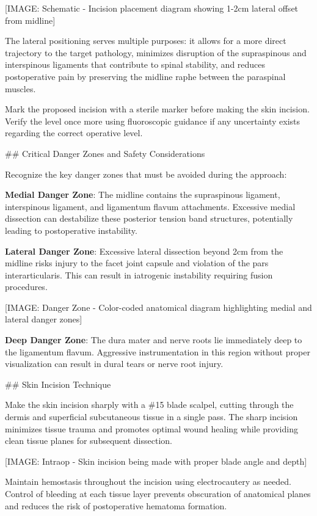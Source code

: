 \documentclass[12pt,a4paper]{article}
\begin{document}
[IMAGE: Schematic - Incision placement diagram showing 1-2cm lateral offset from midline]

The lateral positioning serves multiple purposes: it allows for a more direct trajectory to the target pathology, minimizes disruption of the supraspinous and interspinous ligaments that contribute to spinal stability, and reduces postoperative pain by preserving the midline raphe between the paraspinal muscles.

Mark the proposed incision with a sterile marker before making the skin incision. Verify the level once more using fluoroscopic guidance if any uncertainty exists regarding the correct operative level.

\#\# Critical Danger Zones and Safety Considerations

Recognize the key danger zones that must be avoided during the approach:

\textbf{Medial Danger Zone}: The midline contains the supraspinous ligament, interspinous ligament, and ligamentum flavum attachments. Excessive medial dissection can destabilize these posterior tension band structures, potentially leading to postoperative instability.

\textbf{Lateral Danger Zone}: Excessive lateral dissection beyond 2cm from the midline risks injury to the facet joint capsule and violation of the pars interarticularis. This can result in iatrogenic instability requiring fusion procedures.

[IMAGE: Danger Zone - Color-coded anatomical diagram highlighting medial and lateral danger zones]

\textbf{Deep Danger Zone}: The dura mater and nerve roots lie immediately deep to the ligamentum flavum. Aggressive instrumentation in this region without proper visualization can result in dural tears or nerve root injury.

\#\# Skin Incision Technique

Make the skin incision sharply with a \#15 blade scalpel, cutting through the dermis and superficial subcutaneous tissue in a single pass. The sharp incision minimizes tissue trauma and promotes optimal wound healing while providing clean tissue planes for subsequent dissection.

[IMAGE: Intraop - Skin incision being made with proper blade angle and depth]

Maintain hemostasis throughout the incision using electrocautery as needed. Control of bleeding at each tissue layer prevents obscuration of anatomical planes and reduces the risk of postoperative hematoma formation.
\end{document}
